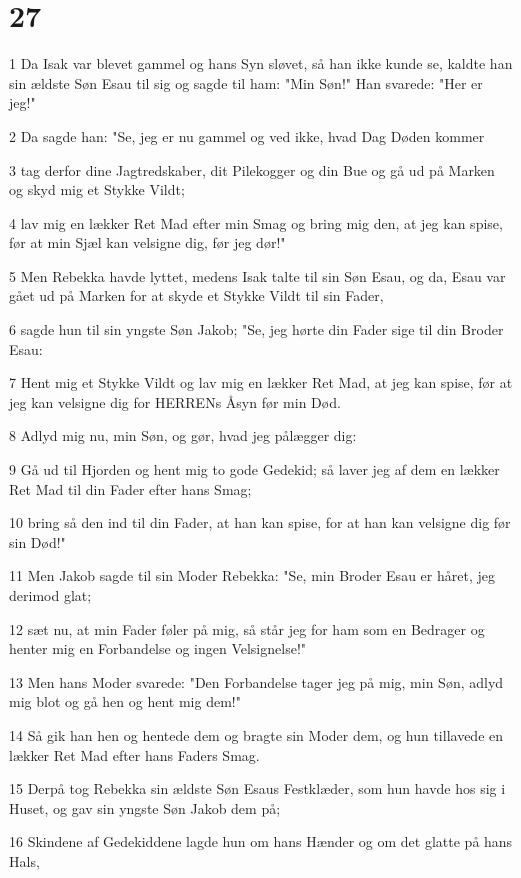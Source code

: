 \chapter{27}

\par 1 Da Isak var blevet gammel og hans Syn sløvet, så han ikke kunde se, kaldte han sin ældste Søn Esau til sig og sagde til ham: "Min Søn!" Han svarede: "Her er jeg!"
\par 2 Da sagde han: "Se, jeg er nu gammel og ved ikke, hvad Dag Døden kommer
\par 3 tag derfor dine Jagtredskaber, dit Pilekogger og din Bue og gå ud på Marken og skyd mig et Stykke Vildt;
\par 4 lav mig en lækker Ret Mad efter min Smag og bring mig den, at jeg kan spise, før at min Sjæl kan velsigne dig, før jeg dør!"
\par 5 Men Rebekka havde lyttet, medens Isak talte til sin Søn Esau, og da, Esau var gået ud på Marken for at skyde et Stykke Vildt til sin Fader,
\par 6 sagde hun til sin yngste Søn Jakob; "Se, jeg hørte din Fader sige til din Broder Esau:
\par 7 Hent mig et Stykke Vildt og lav mig en lækker Ret Mad, at jeg kan spise, før at jeg kan velsigne dig for HERRENs Åsyn før min Død.
\par 8 Adlyd mig nu, min Søn, og gør, hvad jeg pålægger dig:
\par 9 Gå ud til Hjorden og hent mig to gode Gedekid; så laver jeg af dem en lækker Ret Mad til din Fader efter hans Smag;
\par 10 bring så den ind til din Fader, at han kan spise, for at han kan velsigne dig før sin Død!"
\par 11 Men Jakob sagde til sin Moder Rebekka: "Se, min Broder Esau er håret, jeg derimod glat;
\par 12 sæt nu, at min Fader føler på mig, så står jeg for ham som en Bedrager og henter mig en Forbandelse og ingen Velsignelse!"
\par 13 Men hans Moder svarede: "Den Forbandelse tager jeg på mig, min Søn, adlyd mig blot og gå hen og hent mig dem!"
\par 14 Så gik han hen og hentede dem og bragte sin Moder dem, og hun tillavede en lækker Ret Mad efter hans Faders Smag.
\par 15 Derpå tog Rebekka sin ældste Søn Esaus Festklæder, som hun havde hos sig i Huset, og gav sin yngste Søn Jakob dem på;
\par 16 Skindene af Gedekiddene lagde hun om hans Hænder og om det glatte på hans Hals,
